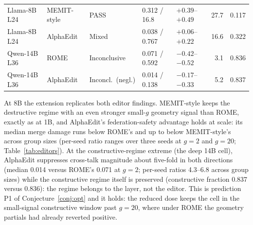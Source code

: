 \documentclass[preprint,12pt]{elsarticle}
\theoremstyle{definition}
\begin{document}
\begin{table}[htbp]
{\begin{tabular}{lllllrr}
Llama-8B L24 & MEMIT-style   & PASS & 0.312 / 16.8 & $+0.39$--$+0.49$ & 27.7 & 0.117 \\
Llama-8B L24 & AlphaEdit     & Mixed & 0.038 / 0.767 & $+0.06$--$+0.22$ & 16.6 & 0.322 \\
Qwen-14B L36 & ROME          & Inconclusive & 0.071 / 0.592 & $-0.42$--$-0.52$ & 3.1 & 0.836 \\
Qwen-14B L36 & AlphaEdit     & Inconcl.~(negl.) & 0.014 / 0.138 & $-0.17$--$-0.33$ & 5.2 & 0.837 \\
\bottomrule
\end{tabular}
}
\end{table}

At 8B the extension replicates both editor findings. MEMIT-style keeps the destructive
regime with an even stronger small-$g$ geometry signal than ROME, exactly as at 1B, and
AlphaEdit's federation-safety advantage holds at scale: its median merge damage runs
\alphaSuppressEightBRome{} below ROME's and up to \alphaSuppressEightBMemit{} below
MEMIT-style's across group sizes (per-seed ratio ranges over three seeds at $g{=}2$ and
$g{=}20$; Table~\ref{tab:editors}).
At the constructive-regime extreme (the deep 14B cell), AlphaEdit suppresses cross-talk
magnitude about five-fold in both directions (median 0.014 versus ROME's 0.071 at
$g{=}2$; per-seed ratios 4.3--6.8 across group sizes) while the constructive regime itself
is preserved (constructive fraction 0.837
versus 0.836): the regime belongs to the layer, not the editor. This is prediction P1 of
Conjecture~\ref{conj:opt} and it holds: the reduced dose keeps the cell in the
small-signal constructive window past $g{=}20$, where under ROME the geometry partials
had already reverted positive.
\end{document}
